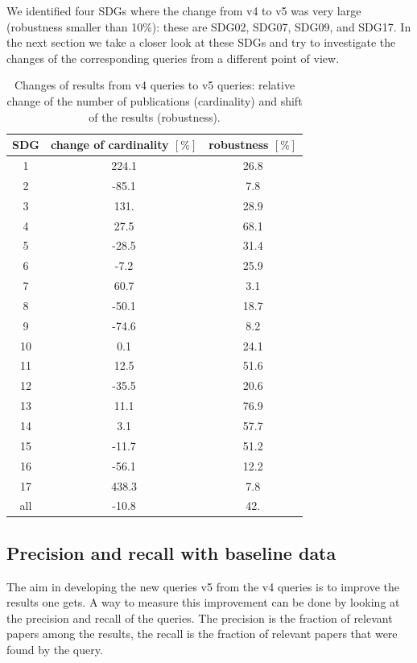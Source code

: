 \documentclass{article}
\begin{document}
We identified four SDGs where the change from v4 to v5 was very large (robustness smaller than 10\%): these are SDG02, SDG07, SDG09, and SDG17. In the next section we take a closer look at these SDGs and try to investigate the changes of the corresponding queries from a different point of view.
\begin{table}[H]
\centering 
 \begin{tabular}{ccc}
 \toprule
  SDG & change of cardinality $[\%]$  & robustness $[\%]$ \\
 \hline
 1 & 224.1 & 26.8 \\
 2 & -85.1 & 7.8 \\
 3 & 131. & 28.9 \\
 4 & 27.5 & 68.1 \\
 5 & -28.5 & 31.4 \\
 6 & -7.2 & 25.9 \\
 7 & 60.7 & 3.1 \\
 8 & -50.1 & 18.7 \\
 9 & -74.6 & 8.2 \\
 10 & 0.1 & 24.1 \\
 11 & 12.5 & 51.6 \\
 12 & -35.5 & 20.6 \\
 13 & 11.1 & 76.9 \\
 14 & 3.1 & 57.7 \\
 15 & -11.7 & 51.2 \\
 16 & -56.1 & 12.2 \\
 17 & 438.3 & 7.8 \\
 all & -10.8 & 42. \\
 \bottomrule
\end{tabular}\caption{Changes of results from v4 queries to v5 queries: relative change of the number of publications (cardinality) and shift of the results (robustness).}
\label{robustnesstable}
\end{table}



\subsection{Precision and recall with baseline data}
\label{sec:precision-recall}
The aim in developing the new queries v5 from the v4 queries is to improve the results one gets. A way to measure this improvement can be done by looking at the precision and recall of the queries. The precision is the fraction of relevant papers among the results, the recall is the fraction of relevant papers that were found by the query.
\end{document}
